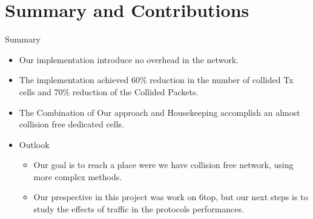 \section{Summary and Contributions}
\begin{withoutheadline}
\begin{frame}{Summary}
  \begin{itemize}
  \item
    Our implementation introduce  \alert{no overhead } in the network.
  \item
    The implementation \alert{achieved 60\% reduction} in the number of collided Tx cells and \alert{70\% reduction} of the Collided Packets.
  \item The Combination of Our approach and Housekeeping accomplish an \alert{ almost collision free dedicated cells}.
  \end{itemize}
  
  \begin{itemize}
  \item
    Outlook
    \begin{itemize}
    \item
     Our goal is to reach a place were we have collision free network, using more complex methods.
    \item
      Our prespective in this project was work on 6top, but our next steps is to study the effects of traffic in the protocols performances.
    \end{itemize}
  \end{itemize}
\end{frame}
\end{withoutheadline}